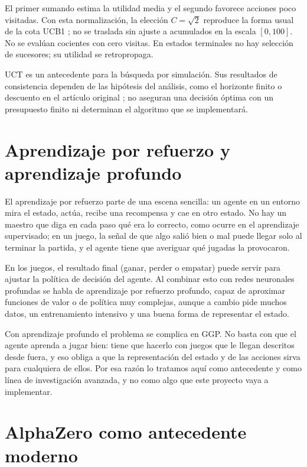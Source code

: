 El primer sumando estima la utilidad media y el segundo favorece acciones poco visitadas. Con esta normalización, la elección $C=\sqrt{2}$ reproduce la forma usual de la cota UCB1 \cite{Auer2002UCB}; no se traslada sin ajuste a acumulados en la escala $[0,100]$. No se evalúan cocientes con cero visitas. En estados terminales no hay selección de sucesores; su utilidad se retropropaga.

UCT es un antecedente para la búsqueda por simulación. Sus resultados de consistencia dependen de las hipótesis del análisis, como el horizonte finito o descuento en el artículo original \cite{Kocsis2006UCT}; no aseguran una decisión óptima con un presupuesto finito ni determinan el algoritmo que se implementará.

\section{Aprendizaje por refuerzo y aprendizaje profundo}

El aprendizaje por refuerzo parte de una escena sencilla: un agente en un entorno mira el estado, actúa, recibe una recompensa y cae en otro estado. No hay un maestro que diga en cada paso qué era lo correcto, como ocurre en el aprendizaje supervisado; en un juego, la señal de que algo salió bien o mal puede llegar solo al terminar la partida, y el agente tiene que averiguar qué jugadas la provocaron.

En los juegos, el resultado final (ganar, perder o empatar) puede servir para ajustar la política de decisión del agente. Al combinar esto con redes neuronales profundas se habla de aprendizaje por refuerzo profundo, capaz de aproximar funciones de valor o de política muy complejas, aunque a cambio pide muchos datos, un entrenamiento intensivo y una buena forma de representar el estado.

Con aprendizaje profundo el problema se complica en GGP. No basta con que el agente aprenda a jugar bien: tiene que hacerlo con juegos que le llegan descritos desde fuera, y eso obliga a que la representación del estado y de las acciones sirva para cualquiera de ellos. Por esa razón lo tratamos aquí como antecedente y como línea de investigación avanzada, y no como algo que este proyecto vaya a implementar.

\section{AlphaZero como antecedente moderno}

